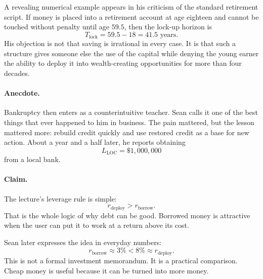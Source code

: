 A revealing numerical example appears in his criticism of the standard retirement script. If money is placed into a retirement account at age eighteen and cannot be touched without penalty until age \(59.5\), then the lock-up horizon is
\begin{equation}
T_{\text{lock}} = 59.5 - 18 = 41.5 \text{ years}.
\end{equation}
His objection is not that saving is irrational in every case. It is that such a structure gives someone else the use of the capital while denying the young earner the ability to deploy it into wealth-creating opportunities for more than four decades.

\paragraph{Anecdote.}
Bankruptcy then enters as a counterintuitive teacher. Sean calls it one of the best things that ever happened to him in business. The pain mattered, but the lesson mattered more: rebuild credit quickly and use restored credit as a base for new action. About a year and a half later, he reports obtaining
\begin{equation}
L_{\text{LOC}} = \$1{,}000{,}000
\end{equation}
from a local bank.

\paragraph{Claim.}
The lecture's leverage rule is simple:
\begin{equation}
r_{\text{deploy}} > r_{\text{borrow}}.
\end{equation}
That is the whole logic of why debt can be good. Borrowed money is attractive when the user can put it to work at a return above its cost.

Sean later expresses the idea in everyday numbers:
\begin{equation}
r_{\text{borrow}} \approx 3\% < 8\% \approx r_{\text{deploy}}.
\end{equation}
This is not a formal investment memorandum. It is a practical comparison. Cheap money is useful because it can be turned into more money.

